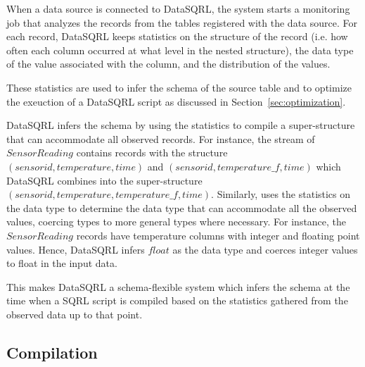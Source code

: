 \documentclass[	DIV=calc,%
							paper=letter,%
							fontsize=11pt,%
							twocolumn]{scrartcl}	 					%
\begin{document}
When a data source is connected to DataSQRL, the system starts a monitoring job that analyzes the records from the tables registered with the data source. For each record, DataSQRL keeps statistics on the structure of the record (i.e. how often each column occurred at what level in the nested structure), the data type of the value associated with the column, and the distribution of the values.

These statistics are used to infer the schema of the source table and to optimize the exeuction of a DataSQRL script as discussed in Section~\ref{sec:optimization}.

DataSQRL infers the schema by using the statistics to compile a super-structure that can accommodate all observed records. For instance, the stream of $SensorReading$ contains records with the structure $(sensorid, temperature, time)$ and $(sensorid, temperature\_f, time)$ which DataSQRL combines into the super-structure $(sensorid, temperature, temperature\_f, time)$. Similarly, uses the statistics on the data type to determine the data type that can accommodate all the observed values, coercing types to more general types where necessary. For instance, the $SensorReading$ records have temperature columns with integer and floating point values. Hence, DataSQRL infers $float$ as the data type and coerces integer values to float in the input data.

This makes DataSQRL a schema-flexible system which infers the schema at the time when a SQRL script is compiled based on the statistics gathered from the observed data up to that point.

\subsection{Compilation}
\label{sec:compilation}
\end{document}

